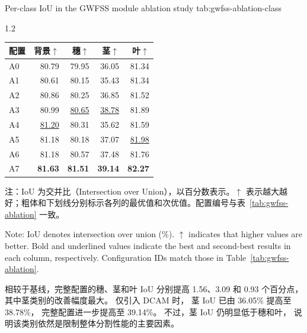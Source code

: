 \begin{table}[!htb]
  \centering
    {Per-class IoU in the GWFSS module ablation study}
    {tab:gwfss-ablation-class}
  \begin{spacing}{1.2}
    \small
    \setlength{\tabcolsep}{6pt}
    \renewcommand{\arraystretch}{1.15}
    \begin{tabular*}{\linewidth}{@{\extracolsep{\fill}}lrrrr@{}}
      \toprule
      配置 & 背景\(\uparrow\) & 穗\(\uparrow\) & 茎\(\uparrow\) & 叶\(\uparrow\) \\
      \midrule
      A0 & 80.79 & 79.95 & 36.05 & 81.34 \\
      A1 & 80.61 & 80.15 & 35.43 & 81.34 \\
      A2 & 80.86 & 80.25 & 36.85 & 81.52 \\
      A3 & 80.99 & \underline{80.65} & \underline{38.78} & 81.89 \\
      A4 & \underline{81.20} & 80.31 & 35.62 & 81.59 \\
      A5 & 81.18 & 80.18 & 37.07 & \underline{81.98} \\
      A6 & 81.18 & 80.57 & 37.48 & 81.76 \\
      \midrule
      A7 & \textbf{81.63} & \textbf{81.51} & \textbf{39.14} & \textbf{82.27} \\
      \bottomrule
    \end{tabular*}
  \end{spacing}
  \par\vspace{8pt}
  \noindent\begin{minipage}{\linewidth}
    \normalfont{}\raggedright
    \noindent 注：IoU 为交并比（Intersection over Union），以百分数表示。\(\uparrow\) 表示越大越好；粗体和下划线分别标示各列的最优值和次优值。配置编号与表~\ref{tab:gwfss-ablation} 一致。\par
    \vspace{2pt}
    \noindent Note: IoU denotes intersection over union (\%). \(\uparrow\) indicates that higher values are better. Bold and underlined values indicate the best and second-best results in each column, respectively. Configuration IDs match those in Table~\ref{tab:gwfss-ablation}.\par
  \end{minipage}\par
\end{table}

相较于基线，完整配置的穗、茎和叶 IoU
分别提高 1.56、3.09 和 0.93 个百分点，
其中茎类别的改善幅度最大。
仅引入 DCAM 时，
茎 IoU 已由 36.05\% 提高至 38.78\%，
完整配置进一步提高至 39.14\%。
不过，茎 IoU 仍明显低于穗和叶，
说明该类别依然是限制整体分割性能的主要因素。

